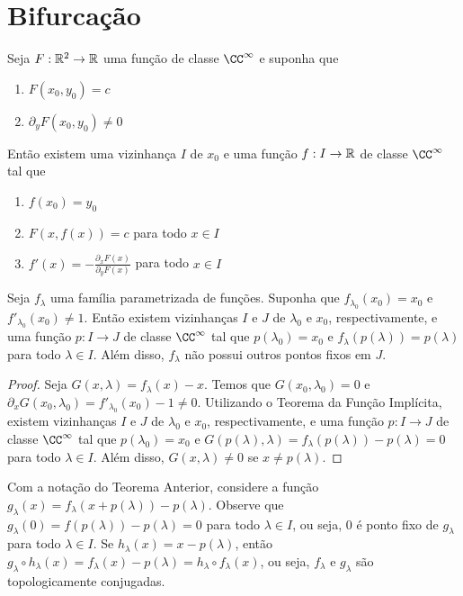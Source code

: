 \section{Bifurcação}

\begin{theorem}
Seja $F: \mathbb{R}^2 \to \mathbb{R}$ uma função de classe $\CC^\infty$ e suponha que
\begin{enumerate}
\item $F(x_0, y_0) = c$
\item $\partial_y F(x_0, y_0) \neq 0$
\end{enumerate} 
Então existem uma vizinhança $I$ de $x_0$ e uma função $f: I \to \mathbb{R}$ de classe $\CC^\infty$ tal que
\begin{enumerate}
\item $f(x_0) = y_0$
\item $F(x, f(x)) = c$ para todo $x \in I$
\item $f'(x) = -\frac{\partial_x F(x)}{\partial_y F(x)}$ para todo $x \in I$
\end{enumerate}
\end{theorem}

\begin{theorem}
Seja $f_\lambda$ uma família parametrizada de funções. Suponha que $f_{\lambda_0}(x_0) = x_0$ e $f'_{\lambda_0}(x_0) \neq 1$. Então existem vizinhanças $I$ e $J$ de $\lambda_0$ e $x_0$, respectivamente, e uma função $p: I \to J$ de classe $\CC^\infty$ tal que $p(\lambda_0) = x_0$ e $f_\lambda(p(\lambda)) = p(\lambda)$ para todo $\lambda \in I$. Além disso, $f_\lambda$ não possui outros pontos fixos em $J$.
\end{theorem}

\begin{proof}
Seja $G(x, \lambda) = f_\lambda(x) - x$. Temos que $G(x_0, \lambda_0) = 0$ e $\partial_x G(x_0, \lambda_0) = f'_{\lambda_0}(x_0) - 1 \neq 0$. Utilizando o Teorema da Função Implícita, existem vizinhanças $I$ e $J$ de $\lambda_0$ e $x_0$, respectivamente, e uma função $p: I \to J$ de classe $\CC^\infty$ tal que $p(\lambda_0) = x_0$ e $G(p(\lambda), \lambda) = f_\lambda(p(\lambda)) - p(\lambda) = 0$ para todo $\lambda \in I$. Além disso, $G(x, \lambda) \neq 0$ se $x \neq p(\lambda)$.
\end{proof}

Com a notação do Teorema Anterior, considere a função $g_\lambda(x) = f_\lambda(x + p(\lambda)) - p(\lambda)$. Observe que $g_\lambda(0) = f(p(\lambda)) - p(\lambda) = 0$ para todo $\lambda \in I$, ou seja, $0$ é ponto fixo de $g_\lambda$ para todo $\lambda \in I$. Se $h_\lambda(x) = x - p(\lambda)$, então $g_\lambda \circ h_\lambda(x) = f_\lambda(x) - p(\lambda) = h_\lambda \circ f_\lambda(x)$, ou seja, $f_\lambda$ e $g_\lambda$ são topologicamente conjugadas.

